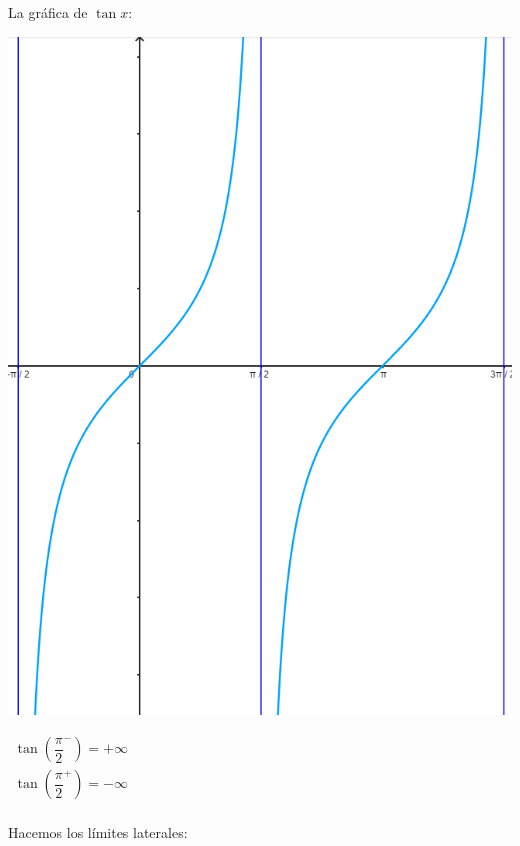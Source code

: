 \begin{enumerate}[label=\color{red}\textbf{\arabic*)}, leftmargin=*]
La gráfica de $\tan x$:
\begin{center}
	\begin{minipage}{0.5\textwidth}
		\includegraphics[scale=0.5]{screenshot001}
	\end{minipage}\begin{minipage}{0.3\textwidth}
		$\begin{array}{l}
			\tan\left(\dfrac{\pi}{2}^{-}\right)=+\infty\\
			\tan\left(\dfrac{\pi}{2}^{+}\right)=-\infty\\
		\end{array}$
	\end{minipage}
\end{center}
Hacemos los límites laterales:
\end{enumerate}
